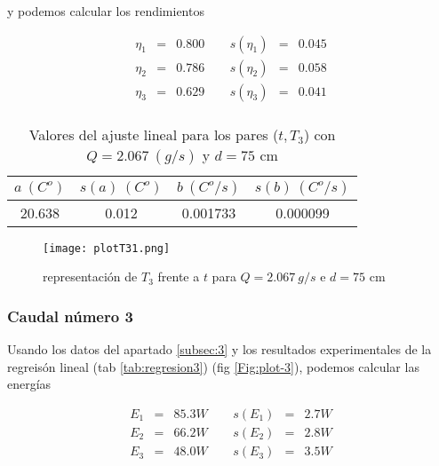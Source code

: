 \documentclass[12pt,a4paper]{article}
\begin{document}
 y podemos calcular los rendimientos 
 
\begin{equation} 
\begin{array}{lllllll}
\eta_1 & = & 0.800  &  \ \ &  s(\eta_1) & =  & 0.045   \\ 
 \eta_2 & = & 0.786  &  \ \ &  s(\eta_2) & =  & 0.058   \\ 
 \eta_3 & = & 0.629  &  \ \ &  s(\eta_3) & =  & 0.041   \\ 
 \end{array} 
\end{equation} 
 
 \begin{table}[h!] 	 \centering 
\begin{tabular}{|c|c|c|c|} 
\hline 
$a \ (C^o)$ & $s(a) \ (C^o)$ & $ b \ (C^o/s)$ & $s(b) \ (C^o/s)$  \\ \hline 
20.638  & 0.012 &  0.001733 & 0.000099 \\ 
\hline
\end{tabular} 
\caption{Valores del ajuste lineal para los pares ($t,T_3$) con $Q=2.067 \ (g/s)$ y $d= 75 $ cm} 
\label{tab:regresion2} 
\end{table} 
 
 
\begin{figure}[h!] 	 \centering 
\texttt{[image: plotT31.png]} 
\caption{representación de $T_3$ frente a $t$ para $Q = 2.067 \ g/s$ e $d = 75$ cm} 
\label{Fig:plot-2}  
\end{figure} 
 
\newpage 
 
 
 
 
\subsubsection{Caudal número 3} 
 
Usando los datos del apartado \ref{subsec:3} y los  resultados experimentales de la regreisón lineal (tab \ref{tab:regresion3}) (fig \ref{Fig:plot-3}), podemos calcular las energías 
 
 \begin{equation} 
\begin{array}{lllllll}
E_1 & = & 85.3 W &  \ \ &  s(E_1) & =  & 2.7  W \\ 
 E_2 & = & 66.2 W &  \ \ &  s(E_2) & =  & 2.8  W \\ 
 E_3 & = & 48.0 W &  \ \ &  s(E_3) & =  & 3.5  W \\ 
 \end{array} 
\end{equation} 
 
\end{document}
